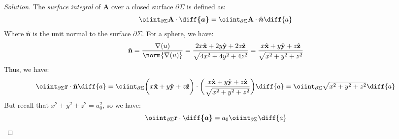 \documentclass[crop=false,class=book,oneside]{standalone}
\begin{document}
            \begin{proof}[Solution]
                The \textit{surface integral} of $\mathbf{A}$
                over a closed surface
                $\partial\Sigma$ is defined as:
                \begin{equation*}
                    \oiint_{\partial\Sigma}
                    \mathbf{A}\cdot\boldsymbol{\diff{a}}
                    =\oiint_{\partial\Sigma}\mathbf{A}
                    \cdot\hat{\boldsymbol{n}}\diff{a}
                \end{equation*}
                Where $\hat{\mathbf{n}}$ is the unit normal
                to the surface $\partial\Sigma$.
                For a sphere, we have:
                \begin{equation*}
                    \hat{\mathbf{n}}
                    =\frac{\nabla(u)}{\norm{\nabla(u)}}
                    =\frac{2x\hat{\mathbf{x}}
                    +2y\hat{\mathbf{y}}
                    +2z\hat{\mathbf{z}}}
                    {\sqrt{4x^{2}+4y^{2}+4z^{2}}}
                    =\frac{x\hat{\mathbf{x}}
                    +y\hat{\mathbf{y}}
                    +z\hat{\mathbf{z}}}
                    {\sqrt{x^{2}+y^{2}+z^{2}}}
                \end{equation*}
                Thus, we have:
                \begin{equation*}
                    \oiint_{\partial\Sigma}
                    \mathbf{r}\cdot\hat{\mathbf{n}}\diff{a}
                    =\oiint_{\partial\Sigma}
                    \bigg(
                         x\hat{\mathbf{x}}
                        +y\hat{\mathbf{y}}
                        +z\hat{\mathbf{z}}
                    \bigg)\cdot\bigg(
                        \frac{%
                             x\hat{\mathbf{x}}
                            +y\hat{\mathbf{y}}
                            +z\hat{\mathbf{z}}}
                            {\sqrt{x^{2}+y^{2}+z^{2}}}
                        \bigg)\diff{a}
                    =\oiint_{\partial\Sigma}
                    \sqrt{x^{2}+y^{2}+z^{2}}\diff{a}
                \end{equation*}
                But recall that $x^{2}+y^{2}+z^{2}=a_{0}^{2}$,
                so we have:
                \begin{equation*}
                    \oiint_{\partial\Sigma}\mathbf{r}
                    \cdot\boldsymbol{\diff{a}}
                    =a_{0}\oiint_{\partial\Sigma}\diff{a}\\
                \end{equation*}

\end{proof}
\end{document}
